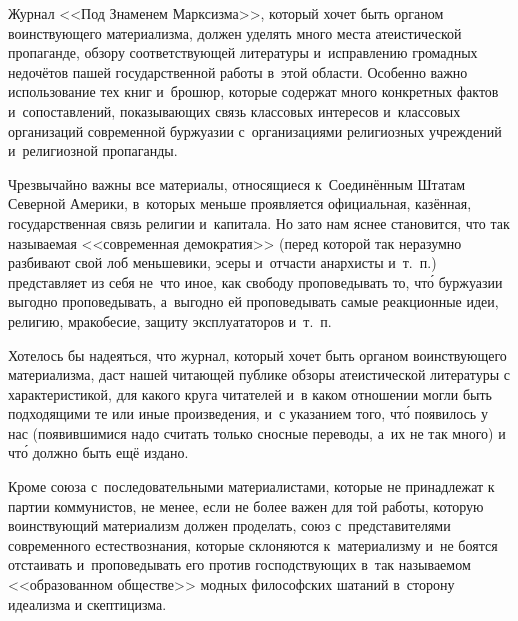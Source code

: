 Журнал <<Под Знаменем Марксизма>>, который хочет быть органом воинствующего
материализма, должен уделять много места атеистической пропаганде, обзору
соответствующей литературы и~исправлению громадных недочётов пашей
государственной работы в~этой области. Особенно важно использование тех
книг и~брошюр, которые содержат много конкретных фактов и~сопоставлений,
показывающих связь классовых интересов и~классовых организаций современной
буржуазии с~организациями религиозных учреждений и~религиозной
пропаганды.

Чрезвычайно важны все материалы, относящиеся к~Соединённым Штатам Северной
Америки, в~которых меньше проявляется официальная, казённая,
государственная связь религии и~капитала. Но зато нам яснее становится, что
так называемая <<современная демократия>> (перед которой так неразумно
разбивают свой лоб меньшевики, эсеры и~отчасти анархисты и~т.~п.)
представляет из себя не~что иное, как свободу проповедывать то, чт\'{о}
буржуазии выгодно проповедывать, а~выгодно ей проповедывать самые
реакционные идеи, религию, мракобесие, защиту эксплуататоров и~т.~п.

Хотелось бы надеяться, что журнал, который хочет быть органом воинствующего
материализма, даст нашей читающей публике обзоры атеистической литературы с
характеристикой, для какого круга читателей и~в каком отношении могли быть
подходящими те или иные произведения, и~с указанием того, чт\'{о} появилось у
нас (появившимися надо считать только сносные переводы, а~их не так много)
и чт\'{о} должно быть ещё издано.

\sectionline

Кроме союза с~последовательными материалистами, которые не принадлежат к
партии коммунистов, не менее, если не более важен для той работы, которую
воинствующий материализм должен проделать, союз с~представителями
современного естествознания, которые склоняются к~материализму и~не боятся
отстаивать и~проповедывать его против господствующих в~так называемом
<<образованном обществе>> модных философских шатаний в~сторону идеализма и
скептицизма.


